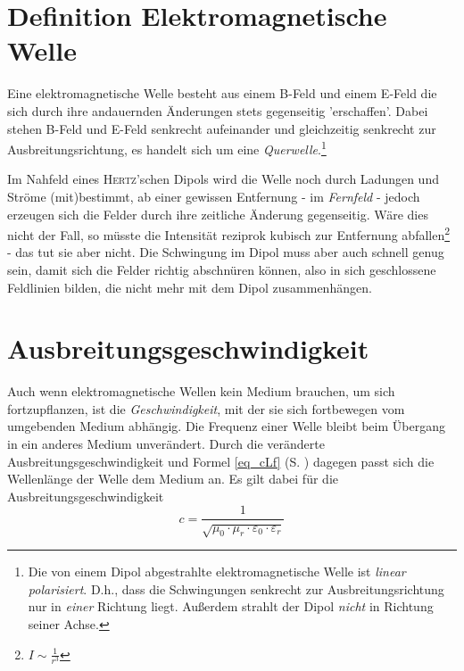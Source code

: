 		\section{Definition Elektromagnetische Welle}

Eine elektromagnetische Welle besteht aus einem B-Feld und einem E-Feld die sich durch ihre andauernden Änderungen stets gegenseitig 'erschaffen'. Dabei stehen B-Feld und E-Feld senkrecht aufeinander und gleichzeitig senkrecht zur Ausbreitungsrichtung, es handelt sich um eine \emph{Querwelle}.\footnote{Die von einem Dipol abgestrahlte elektromagnetische Welle ist \emph{linear polarisiert}. D.h., dass die Schwingungen senkrecht zur Ausbreitungsrichtung nur in \emph{einer} Richtung liegt. Außerdem strahlt der Dipol \emph{nicht} in Richtung seiner Achse.}

Im Nahfeld eines \textsc{Hertz}'schen Dipols wird die Welle noch durch Ladungen und Ströme (mit)bestimmt, ab einer gewissen Entfernung - im \emph{Fernfeld} - jedoch erzeugen sich die Felder durch ihre zeitliche Änderung gegenseitig. Wäre dies nicht der Fall, so müsste die Intensität reziprok kubisch zur Entfernung abfallen\footnote{\(I \sim \frac{1}{r^3}\)} - das tut sie aber nicht. Die Schwingung im Dipol muss aber auch schnell genug sein, damit sich die Felder richtig abschnüren können, also in sich geschlossene Feldlinien bilden, die nicht mehr mit dem Dipol zusammenhängen.



		\section{Ausbreitungsgeschwindigkeit}
		\label{ss_Ausbreitungsgeschwindigkeit}

Auch wenn elektromagnetische Wellen kein Medium brauchen, um sich fortzupflanzen, ist die \emph{Geschwindigkeit}, mit der sie sich fortbewegen vom umgebenden Medium abhängig. Die Frequenz einer Welle bleibt beim Übergang in ein anderes Medium unverändert. Durch die veränderte Ausbreitungsgeschwindigkeit und Formel \ref{eq_cLf} (S. \pageref{eq_cLf}) dagegen passt sich die Wellenlänge der Welle dem Medium an. Es gilt dabei für die Ausbreitungsgeschwindigkeit
\begin{equation}
 	c = \frac{1}{\sqrt{\mu_0 \cdot \mu_r \cdot \varepsilon_0 \cdot \varepsilon_r}}
\end{equation}





